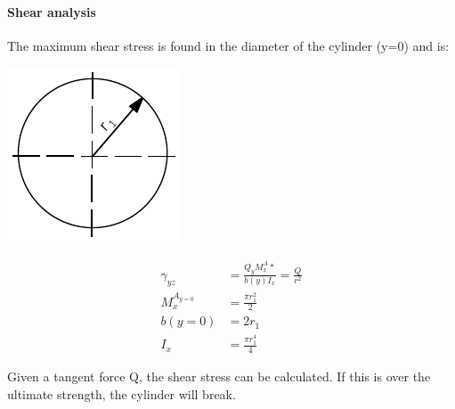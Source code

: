   \paragraph{Shear analysis} %
  \label{ssub:shear_analysis}
  The maximum shear stress is found in the diameter of the cylinder (y=0) and is:
  
  \noindent\begin{minipage}{0.2\textwidth}%
  \includegraphics[width=\linewidth]{figures/profile_tube.pdf}
  \end{minipage}%
  \hfill%
  \begin{minipage}{0.8\textwidth}
    \begin{equation}
    \begin{aligned}
      \gamma_{yz} &= \frac{Q_y M_{x}^A*}{b(y) I_x} = \frac{Q}{r^2}\\
      M_{x}^{A_{y=0}} &= \frac{\pi r_1^2}{2} \\
      b(y=0) &= 2 r_1 \\
      I_x &= \frac{\pi r_1^4}{4}
      \end{aligned}
    \end{equation}
  \end{minipage}
  Given a tangent force Q, the shear stress can be calculated.
  If this is over the ultimate strength, the cylinder will break.


